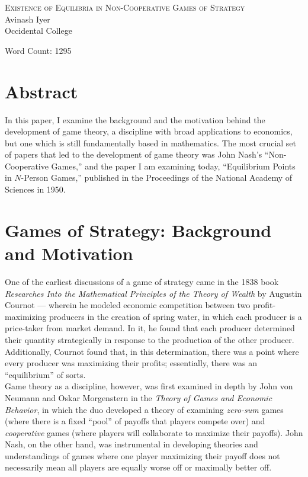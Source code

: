 \documentclass[12pt]{extarticle}
\title{}
\author{}
\date{}
\begin{document}
\doublespacing
  \begin{center}
    {\large \scshape Existence of Equilibria in Non-Cooperative Games of Strategy}\\
    Avinash Iyer\\
    Occidental College
  \end{center}
  Word Count: 1295
  \section*{Abstract}%
  In this paper, I examine the background and the motivation behind the development of game theory, a discipline with broad applications to economics, but one which is still fundamentally based in mathematics. The most crucial set of papers that led to the development of game theory was John Nash's ``Non-Cooperative Games,'' and the paper I am examining today, ``Equilibrium Points in $N$-Person Games,'' published in the Proceedings of the National Academy of Sciences in 1950.

  \section*{Games of Strategy: Background and Motivation}%
  One of the earliest discussions of a game of strategy came in the 1838 book \textit{Researches Into the Mathematical Principles of the Theory of Wealth} by Augustin Cournot\supercite{cournot} --- wherein he modeled economic competition between two profit-maximizing producers in the creation of spring water, in which each producer is a price-taker from market demand. In it, he found that each producer determined their quantity strategically in response to the production of the other producer. Additionally, Cournot found that, in this determination, there was a point where every producer was maximizing their profits; essentially, there was an ``equilibrium'' of sorts.\\

  Game theory as a discipline, however, was first examined in depth by John von Neumann and Oskar Morgenstern in the \textit{Theory of Games and Economic Behavior}\supercite{von_neumann_theory_1944}, in which the duo developed a theory of examining \textit{zero-sum} games (where there is a fixed ``pool'' of payoffs that players compete over) and \textit{cooperative} games (where players will collaborate to maximize their payoffs). John Nash, on the other hand, was instrumental in developing theories and understandings of games where one player maximizing their payoff does not necessarily mean all players are equally worse off or maximally better off.\\
\end{document}
